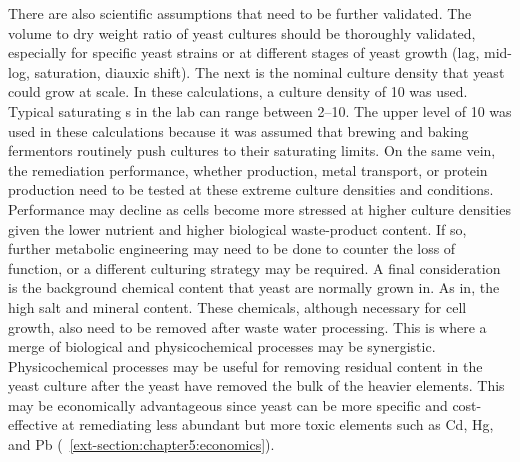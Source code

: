 \documentclass[../main/main]{subfiles}
\begin{document}
There are also scientific assumptions that need to be further validated. The volume to dry weight ratio of yeast cultures should be thoroughly validated, especially for specific yeast strains or at different stages of yeast growth (lag, mid-log, saturation, diauxic shift). The next is the nominal culture density that yeast could grow at scale. In these calculations, a culture density of 10 \OD{} was used. Typical saturating \OD{}s in the lab can range between 2--10. The upper \OD{} level of 10 was used in these calculations because it was assumed that brewing and baking fermentors routinely push cultures to their saturating limits. On the same vein, the remediation performance, whether \HS{} production, metal transport, or protein production need to be tested at these extreme culture densities and conditions. Performance may decline as cells become more stressed at higher culture densities given the lower nutrient and higher biological waste-product content. If so, further metabolic engineering may need to be done to counter the loss of function, or a different culturing strategy may be required. A final consideration is the background chemical content that yeast are normally grown in. As in, the high salt and mineral content. These chemicals, although necessary for cell growth, also need to be removed after waste water processing. This is where a merge of biological and physicochemical processes may be synergistic. Physicochemical processes may be useful for removing residual content in the yeast culture after the yeast have removed the bulk of the heavier elements. This may be economically advantageous since yeast can be more specific and cost-effective at remediating less abundant but more toxic elements such as Cd, Hg, and Pb (\CHAPTER~\ref{ext-section:chapter5:economics}).

\printbibliography[title=References]
\end{document}
